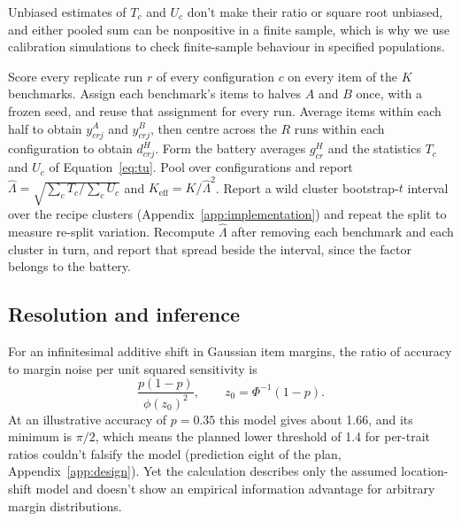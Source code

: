 \documentclass{article}
\newcommand{\Lam}{\Lambda}
\begin{document}
Unbiased estimates of $T_c$ and $U_c$ don't make their ratio or square root unbiased, and either pooled sum can be nonpositive in a finite sample, which is why we use calibration simulations to check finite-sample behaviour in specified populations.

\begin{algorithm}[t]
\caption{SNAP measurement recipe for a fixed battery of $K$ benchmarks scored on $R$ replicate runs per configuration. The primary analysis below used a random frozen split and checked a passage-aware split, and the registered test kept passage-linked items in one half.}
\label{alg:snap}
\begin{algorithmic}[1]
\STATE Score every replicate run $r$ of every configuration $c$ on every item of the $K$ benchmarks.
\STATE Assign each benchmark's items to halves $A$ and $B$ once, with a frozen seed, and reuse that assignment for every run.
\STATE Average items within each half to obtain $y^A_{crj}$ and $y^B_{crj}$, then centre across the $R$ runs within each configuration to obtain $d^H_{crj}$.
\STATE Form the battery averages $g^H_{cr}$ and the statistics $T_c$ and $U_c$ of Equation~\ref{eq:tu}.
\STATE Pool over configurations and report $\widehat\Lam=\sqrt{\sum_c T_c/\sum_c U_c}$ and $K_{\mathrm{eff}}=K/\widehat\Lam^2$.
\STATE Report a wild cluster bootstrap-$t$ interval over the recipe clusters (Appendix~\ref{app:implementation}) and repeat the split to measure re-split variation.
\STATE Recompute $\widehat\Lam$ after removing each benchmark and each cluster in turn, and report that spread beside the interval, since the factor belongs to the battery.
\end{algorithmic}
\end{algorithm}


\subsection{Resolution and inference}
For an infinitesimal additive shift in Gaussian item margins, the ratio of accuracy to margin noise per unit squared sensitivity is
\begin{equation}
\frac{p(1-p)}{\phi(z_0)^2},\qquad z_0=\Phi^{-1}(1-p).
\label{eq:information}
\end{equation}
At an illustrative accuracy of $p=0.35$ this model gives about 1.66, and its minimum is $\pi/2$, which means the planned lower threshold of 1.4 for per-trait ratios couldn't falsify the model (prediction eight of the plan, Appendix~\ref{app:design}). Yet the calculation describes only the assumed location-shift model and doesn't show an empirical information advantage for arbitrary margin distributions.
\end{document}
